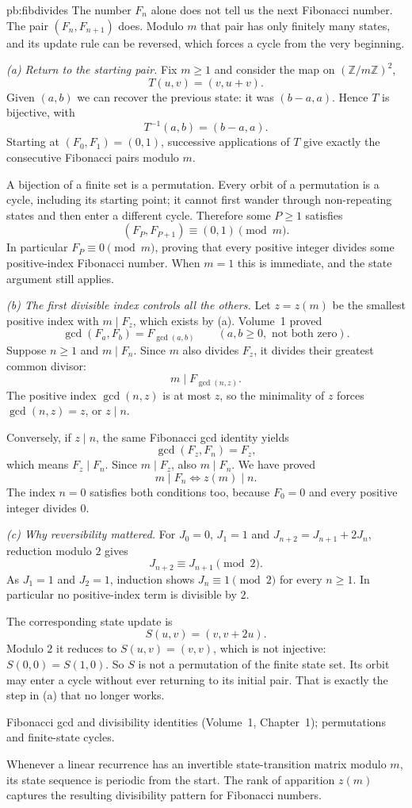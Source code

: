 \begin{solution}{pb:fibdivides}
\idea The number $F_n$ alone does not tell us the next Fibonacci number. The pair $(F_n,F_{n+1})$ does. Modulo $m$ that pair has only finitely many states, and its update rule can be reversed, which forces a cycle from the very beginning.

\writeup \emph{(a) Return to the starting pair.}
Fix $m\ge1$ and consider the map on $(\mathbb Z/m\mathbb Z)^2$,
\[
T(u,v)=(v,u+v).
\]
Given $(a,b)$ we can recover the previous state: it was $(b-a,a)$. Hence $T$ is bijective, with
\[
T^{-1}(a,b)=(b-a,a).
\]
Starting at $(F_0,F_1)=(0,1)$, successive applications of $T$ give exactly the consecutive Fibonacci pairs modulo $m$.

A bijection of a finite set is a permutation. Every orbit of a permutation is a cycle, including its starting point; it cannot first wander through non-repeating states and then enter a different cycle. Therefore some $P\ge1$ satisfies
\[
(F_P,F_{P+1})\equiv(0,1)\pmod m.
\]
In particular $F_P\equiv0\pmod m$, proving that every positive integer divides some positive-index Fibonacci number. When $m=1$ this is immediate, and the state argument still applies.

\emph{(b) The first divisible index controls all the others.}
Let $z=z(m)$ be the smallest positive index with $m\mid F_z$, which exists by (a). Volume~1 proved
\[
\gcd(F_a,F_b)=F_{\gcd(a,b)}
\qquad(a,b\ge0,\text{ not both zero}).
\]
Suppose $n\ge1$ and $m\mid F_n$. Since $m$ also divides $F_z$, it divides their greatest common divisor:
\[
m\mid F_{\gcd(n,z)}.
\]
The positive index $\gcd(n,z)$ is at most $z$, so the minimality of $z$ forces $\gcd(n,z)=z$, or $z\mid n$.

Conversely, if $z\mid n$, the same Fibonacci gcd identity yields
\[
\gcd(F_z,F_n)=F_z,
\]
which means $F_z\mid F_n$. Since $m\mid F_z$, also $m\mid F_n$. We have proved
\[
\boxed{m\mid F_n\iff z(m)\mid n.}
\]
The index $n=0$ satisfies both conditions too, because $F_0=0$ and every positive integer divides $0$.

\emph{(c) Why reversibility mattered.}
For $J_0=0$, $J_1=1$ and $J_{n+2}=J_{n+1}+2J_n$, reduction modulo $2$ gives
\[
J_{n+2}\equiv J_{n+1}\pmod2.
\]
As $J_1=1$ and $J_2=1$, induction shows $J_n\equiv1\pmod2$ for every $n\ge1$. In particular no positive-index term is divisible by $2$.

The corresponding state update is
\[
S(u,v)=(v,v+2u).
\]
Modulo $2$ it reduces to $S(u,v)=(v,v)$, which is not injective: $S(0,0)=S(1,0)$. So $S$ is not a permutation of the finite state set. Its orbit may enter a cycle without ever returning to its initial pair. That is exactly the step in (a) that no longer works.

\tools Fibonacci gcd and divisibility identities (Volume~1, Chapter~1); permutations and finite-state cycles.

\leads Whenever a linear recurrence has an invertible state-transition matrix modulo $m$, its state sequence is periodic from the start. The rank of apparition $z(m)$ captures the resulting divisibility pattern for Fibonacci numbers.
\end{solution}

